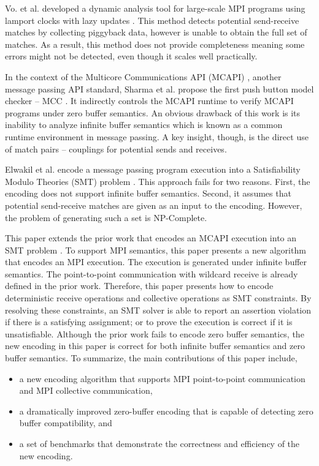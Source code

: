 Vo. et al. developed a dynamic analysis tool for large-scale MPI programs using lamport clocks with lazy updates \cite{DBLP:conf/sc/VoAGSSB10, DBLP:conf/IEEEpact/VoGKSSB11}. This method detects potential send-receive matches by collecting piggyback data, however is unable to obtain the full set of matches. As a result, this method does not provide completeness meaning some errors might not be detected, even though it scales well practically.

In the context of the Multicore Communications API (MCAPI) \cite{mcapi}, another message passing API standard, Sharma et al. propose the first push button model checker -- MCC \cite{DBLP:conf/fmcad/SharmaGMH09}. It indirectly controls the MCAPI runtime to verify MCAPI programs under zero buffer semantics. An obvious drawback of this work is its inability to analyze infinite buffer semantics which is known as a common runtime environment in message passing. A key insight, though, is the direct use of match pairs -- couplings for potential sends and receives.

Elwakil et al. encode a message passing program execution into a Satisfiability Modulo Theories (SMT) problem  \cite{barrett2008satisfiability} \cite{DBLP:conf/issta/ElwakilY10, DBLP:conf/atva/ElwakilYW10}. This approach fails for two reasons. First, the encoding does not support infinite buffer semantics. Second, it assumes that potential send-receive matches are given as an input to the encoding. However, the problem of generating such a set is NP-Complete.

This paper extends the prior work that encodes an MCAPI execution into an SMT problem \cite{DBLP:conf/kbse/HuangMM13}. To support MPI semantics, this paper presents a new algorithm that encodes an MPI execution. The execution is generated under infinite buffer semantics. The point-to-point communication with wildcard receive is already defined in the prior work. Therefore, this paper presents how to encode deterministic receive operations and collective operations as SMT constraints. By resolving these constraints, an SMT solver is able to report an assertion violation if there is a satisfying assignment; or to prove the execution is correct if it is unsatisfiable. Although the prior work \cite{DBLP:conf/kbse/HuangMM13} fails to encode zero buffer semantics, the new encoding in this paper is correct for both infinite buffer semantics and zero buffer semantics. To summarize, the main contributions of this paper include,
\begin{itemize}
\item a new encoding algorithm that supports MPI point-to-point communication and MPI collective communication,
\item a dramatically improved zero-buffer encoding that is capable of detecting zero buffer compatibility, and
\item a set of benchmarks that demonstrate the correctness and efficiency of the new encoding.
\end{itemize}

